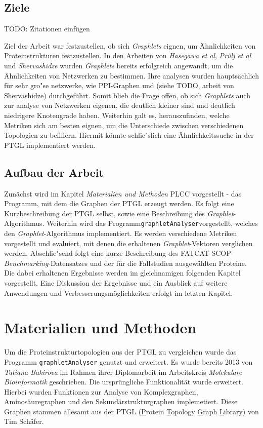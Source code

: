 \documentclass{report}
\begin{document}
\section{Ziele}

TODO: Zitationen einf\"ugen

Ziel der Arbeit war festzustellen, ob sich \textit{Graphlets} eignen, um \"Ahnlichkeiten von Proteinstrukturen festzustellen. In den Arbeiten von \emph{Hasegawa et al}, \emph{Pr\v{u}lj et al} und \emph{Shervashidze} wurden \textit{Graphlets} bereits erfolgreich angewandt, um die \"Ahnlichkeiten von Netzwerken zu bestimmen. Ihre analysen wurden haupts\"achlich f\"ur sehr gro"se netzwerke, wie PPI-Graphen und (siehe TODO, arbeit von Shervashidze) durchgef\"uhrt. Somit blieb die Frage offen, ob sich \textit{Graphlets} auch zur analyse von Netzwerken eigenen, die deutlich kleiner sind und deutlich niedrigere Knotengrade haben.
Weiterhin galt es, herauszufinden, welche Metriken sich am besten eignen, um die Unterschiede zwischen verschiedenen Topologien zu befiffern.
Hiermit k\"onnte schlie"slich eine \"Ahnlichkeitssuche in der PTGL implementiert werden.

\section{Aufbau der Arbeit}

Zun\"achst wird im Kapitel \emph{Materialien und Methoden} PLCC vorgestellt - das Programm, mit dem die Graphen der PTGL erzeugt werden. Es folgt eine Kurzbeschreibung der PTGL selbst, sowie eine Beschreibung des \textit{Graphlet}-Algorithmus. Weiterhin wird das Programm\texttt{graphletAnalyser}vorgestellt, welches den \textit{Graphlet}-Algorithmus implementiert. Es werden verschiedene Metriken vorgestellt und evaluiert, mit denen die erhaltenen \textit{Graphlet}-Vektoren verglichen werden.
Abschlie"send folgt eine kurze Beschreibung des FATCAT-SCOP-\textit{Benchmarking}-Datensatzes und der f\"ur die Fallstudien ausgew\"ahlten Proteine.
Die dabei erhaltenen Ergebnisse werden im gleichnamigen folgenden Kapitel vorgestellt. Eine Diskussion der Ergebnisse und ein Ausblick auf weitere Anwendungen und Verbesserungsm\"oglichkeiten erfolgt im letzten Kapitel.

\chapter{Materialien und Methoden}

Um die Proteinstrukturtopologien aus der PTGL zu vergleichen wurde das Programm \texttt{graphletAnalyser} genutzt und erweitert. Es wurde bereits 2013 von \textit{Tatiana Bakirova} im Rahmen ihrer Diplomarbeit im Arbeitskreis \textit{Molekulare Bioinformatik} geschrieben. Die urspr\"ungliche Funktionalität wurde erweitert. Hierbei wurden Funktionen zur Analyse von Komplexgraphen, Aminos\"auregraphen und den Sekund\"arstrukturgraphen implemetiert. Diese Graphen stammen allesamt aus der PTGL (\underline{P}rotein \underline{T}opology \underline{G}raph \underline{L}ibrary) von Tim Sch\"afer.
\end{document}
